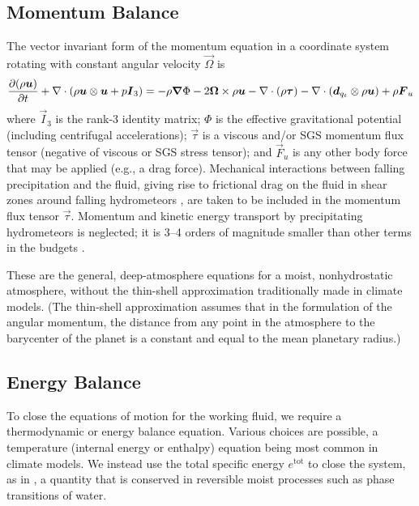 \documentclass{article}
\begin{document}
\subsection{Momentum Balance}

The vector invariant form of the momentum equation in a coordinate system rotating with constant angular velocity $\vec{\Omega}$ is 
\begin{equation}
\frac{\partial (\rho\boldsymbol{{u}})}{\partial t} + \nabla \cdot \left( \rho\boldsymbol{{u}} \otimes \boldsymbol{{u}} + p \boldsymbol{{I}}_3\right) =  - \rho \boldsymbol{{\nabla}}\Phi - 2\boldsymbol{{\Omega}} \times \rho\boldsymbol{{u}} - \nabla \cdot (\rho \boldsymbol{{\tau}}) - \nabla \cdot\left( \boldsymbol{{d}}_{q_t} \otimes \rho\boldsymbol{{u}} \right) + \rho \boldsymbol{{F}}_u
\label{eq:governing_equations/momentum}
\end{equation}
where $\vec{I}_3$ is the rank-3 identity matrix; $\Phi$ is the effective gravitational potential (including centrifugal accelerations); $\vec{\tau}$ is a viscous and/or SGS momentum flux tensor (negative of viscous or SGS stress tensor); and $\vec{F}_u$ is any other body force that may be applied (e.g., a drag force). Mechanical interactions between falling precipitation and the fluid, giving rise to frictional drag on the fluid in shear zones around falling hydrometeors \citep{Pauluis00}, are taken to be included in the momentum flux tensor $\vec{\tau}$. Momentum and kinetic energy transport by precipitating hydrometeors is neglected; it is 3--4 orders of magnitude smaller than other terms in the budgets \citep{Romps08a}.

These are the general, deep-atmosphere equations for a moist, nonhydrostatic atmosphere, without the thin-shell approximation traditionally made in climate models. (The thin-shell approximation assumes that in the formulation of the angular momentum, the distance from any point in the atmosphere to the barycenter of the planet is a constant and equal to the mean planetary radius.)

\subsection{Energy Balance}

To close the equations of motion for the working fluid, we require a thermodynamic or energy balance equation. Various choices are possible, a temperature (internal energy or enthalpy) equation being most common in climate models. We instead use the total specific energy $e^\mathrm{tot}$ to close the system, as in \citet{Romps08a}, a quantity that is conserved in reversible moist processes such as phase transitions of water. 
\end{document}

